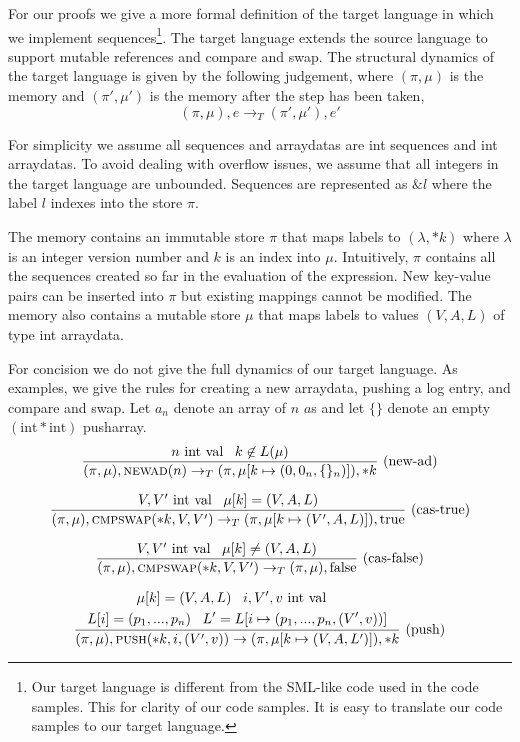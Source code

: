 For our proofs we give a more formal definition of the target language in which we implement sequences\footnote{Our target language is different from the SML-like code used in the code samples. This for clarity of our code samples. It is easy to translate our code samples to our target language.}. The target language extends the source language to support mutable references and compare and swap. The structural dynamics of the target language is given by the following judgement, where $(\pi, \mu)$ is the memory and $(\pi', \mu')$ is the memory after the step has been taken,
$$(\pi, \mu), e \to_T (\pi', \mu'), e'$$

For simplicity we assume all sequences and arraydatas are int sequences and int arraydatas. To avoid dealing with overflow issues, we assume that all integers in the target language are unbounded. Sequences are represented as $\&l$ where the label $l$ indexes into the store $\pi$.

The memory contains an immutable store $\pi$ that maps labels to $(\lambda, *k)$ where $\lambda$ is an integer version number and $k$ is an index into $\mu$. Intuitively, $\pi$ contains all the sequences created so far in the evaluation of the expression. New key-value pairs can be inserted into $\pi$ but existing mappings cannot be modified. The memory also contains a mutable store $\mu$ that maps labels to values $(V, A, L)$ of type int arraydata. 

For concision we do not give the full dynamics of our target language. As examples, we give the rules for creating a new arraydata, pushing a log entry, and compare and swap. Let $a_n$ denote an array of $n$ $a$s and let $\{\}$ denote an empty $(\mbox{int} * \mbox{int})$ pusharray.
$$\frac{n \text{ int val} \;\;\; k \not\in L(\mu)}{(\pi, \mu), \mbox{{\sc newad}}(n) \to_T (\pi, \mu[k \mapsto (0, 0_n, \{\}_n)]), *k}\text{ (new-ad)}$$

$$\frac{V, V' \text{ int val} \;\;\; \mu[k] = (V, A, L)}{(\pi, \mu), \mbox{{\sc cmpswap}}(*k, V, V') \to_T (\pi, \mu[k \mapsto (V', A, L)]), \text{true}}\text{ (cas-true)}$$

$$\frac{V, V' \text{ int val} \;\;\; \mu[k] \neq (V, A, L)}{(\pi,\mu), \text{{\sc cmpswap}}(*k, V, V') \to_T (\pi,\mu), \text{false}}\text{ (cas-false)}$$

$$\frac{\begin{gathered}\mu[k] = (V, A, L) \;\;\; i, V', v \text{ int val} \;\;\; \\ L[i] = (p_1, ..., p_n) \;\;\; L' = L[i \mapsto (p_1, ..., p_n, (V',v))]\end{gathered}}{(\pi,\mu), \text{{\sc push}}(*k, i, (V', v)) \to (\pi,\mu[k \mapsto (V, A, L')]), *k} \text{ (push)}$$

